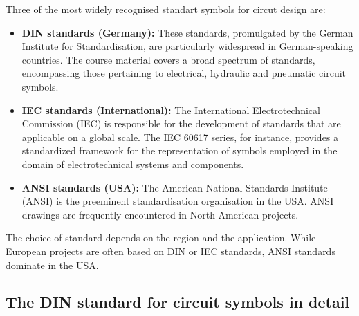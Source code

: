 Three of the most widely recognised standart symbols for circut design are:
\begin{itemize}
\item \textbf{DIN standards (Germany): }These standards, promulgated by the German Institute for Standardisation, are particularly widespread in German-speaking countries. The course material covers a broad spectrum of standards, encompassing those pertaining to electrical, hydraulic and pneumatic circuit symbols.
\item \textbf{IEC standards (International):} The International Electrotechnical Commission (IEC) is responsible for the development of standards that are applicable on a global scale. The IEC 60617 series, for instance, provides a standardized framework for the representation of symbols employed in the domain of electrotechnical systems and components.
\item \textbf{ANSI standards (USA):} The American National Standards Institute (ANSI) is the preeminent standardisation organisation in the USA. ANSI drawings are frequently encountered in North American projects.
\end{itemize}
The choice of standard depends on the region and the application. While European projects are often based on DIN or IEC standards, ANSI standards dominate in the USA.

\subsection*{The DIN standard for circuit symbols in detail}

